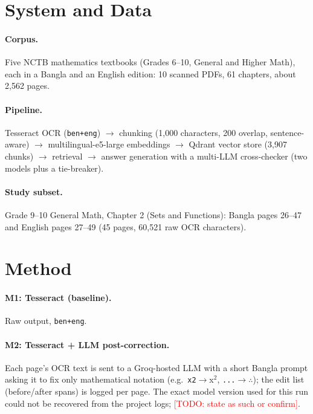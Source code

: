 \documentclass[11pt]{article}
\newcommand{\todo}[1]{\textcolor{red}{[TODO: #1]}}
\begin{document}
\section{System and Data}\label{sec:system}
\paragraph{Corpus.} Five NCTB mathematics textbooks (Grades 6--10, General and
Higher Math), each in a Bangla and an English edition: 10 scanned PDFs,
61 chapters, about 2{,}562 pages.

\paragraph{Pipeline.} Tesseract OCR (\texttt{ben+eng}) $\rightarrow$
chunking (1{,}000 characters, 200 overlap, sentence-aware) $\rightarrow$
multilingual-e5-large embeddings $\rightarrow$ Qdrant vector store
(3{,}907 chunks) $\rightarrow$ retrieval $\rightarrow$ answer generation with a
multi-LLM cross-checker (two models plus a tie-breaker).

\paragraph{Study subset.} Grade 9--10 General Math, Chapter 2 (Sets and
Functions): Bangla pages 26--47 and English pages 27--49 (45 pages,
60{,}521 raw OCR characters).

\section{Method}
\paragraph{M1: Tesseract (baseline).} Raw output, \texttt{ben+eng}.
\paragraph{M2: Tesseract + LLM post-correction.} Each page's OCR text is sent to
a Groq-hosted LLM with a short Bangla prompt asking it to fix only
mathematical notation (e.g.\ \texttt{x2}$\rightarrow$x$^2$,
\texttt{...}$\rightarrow\therefore$); the edit list (before/after spans) is
logged per page. The exact model version used for this run could not be
recovered from the project logs; \todo{state as such or confirm}.
\end{document}
